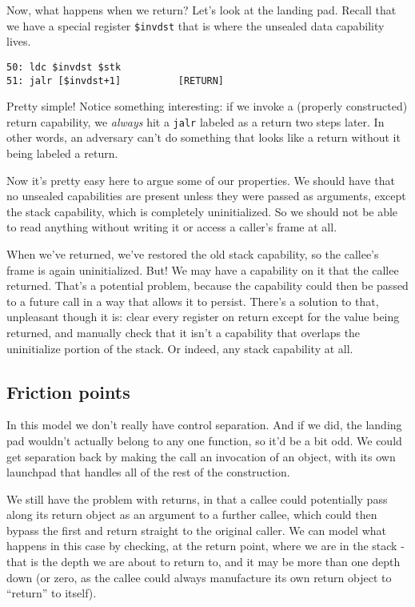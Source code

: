 \documentclass{article}
\begin{document}
Now, what happens when we return? Let's look at the landing pad. Recall that we have a special
register {\tt \$invdst} that is where the unsealed data capability lives.

\begin{verbatim}
50: ldc $invdst $stk
51: jalr [$invdst+1]          [RETURN]
\end{verbatim}

Pretty simple! Notice something interesting: if we invoke a (properly constructed) return capability,
we {\it always} hit a {\tt jalr} labeled as a return two steps later. In other words, an adversary can't do
something that looks like a return without it being labeled a return.

Now it's pretty easy here to argue some of our properties. We should have that no unsealed capabilities are
present unless they were passed as arguments, except the stack capability, which is completely uninitialized.
So we should not be able to read anything without writing it or access a caller's frame at all.

When we've returned, we've restored the old stack capability, so the callee's frame is again uninitialized.
But! We may have a capability on it that the callee returned. That's a potential problem, because the capability
could then be passed to a future call in a way that allows it to persist. There's a solution to that, unpleasant
though it is: clear every register on return except for the value being returned, and manually check that it
isn't a capability that overlaps the uninitialize portion of the stack. Or indeed, any stack capability at all.

\subsection{Friction points}

In this model we don't really have control separation. And if we did, the landing pad wouldn't
actually belong to any one function, so it'd be a bit odd. We could get separation back by making
the call an invocation of an object, with its own launchpad that handles all of the rest of the
construction.

We still have the problem with returns, in that a callee could potentially pass along its
return object as an argument to a further callee, which could then bypass the first and return
straight to the original caller. We can model what happens in this case by checking, at the return point,
where we are in the stack - that is the depth we are about to return to, and it may be more than one depth
down (or zero, as the callee could always manufacture its own return object to ``return'' to itself).
\end{document}
